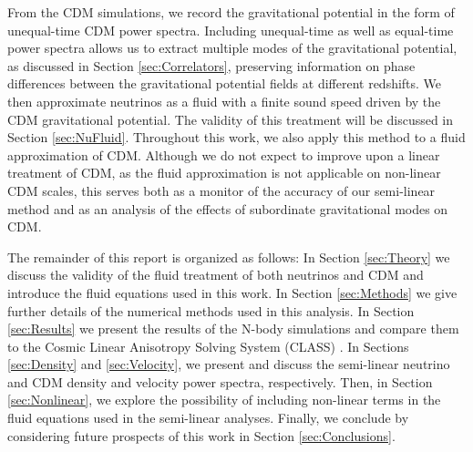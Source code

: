 \documentclass{aastex}
\begin{document}
From the CDM simulations, we record the gravitational
potential in the form of unequal-time CDM power
spectra. Including unequal-time as well as equal-time power spectra
allows us to extract multiple modes of the gravitational
potential, as discussed in Section \ref{sec:Correlators},
preserving information on phase differences between the gravitational potential
fields at different redshifts.  
We then approximate neutrinos as a fluid with a finite sound
speed driven by the CDM gravitational potential.  The
validity of this treatment will be discussed in Section
\ref{sec:NuFluid}.  Throughout this work, we also apply this 
method to a fluid approximation of CDM.  Although we do
not expect to improve upon a linear treatment of CDM, as the
fluid approximation is not applicable on non-linear CDM
scales, 
this serves both as a monitor
of the accuracy of our semi-linear method and as an analysis of the
effects of subordinate gravitational modes on CDM.

The remainder of this report is organized as follows:  In Section
\ref{sec:Theory} we discuss the validity of the fluid treatment
of both neutrinos and CDM and introduce the fluid equations
used in this work.  In Section \ref{sec:Methods} we give further
details of the numerical methods used in this analysis.  In Section
\ref{sec:Results} we present the results of the N-body
simulations and compare them to the Cosmic Linear Anisotropy
Solving System (CLASS) \citep{class11}.  In Sections
\ref{sec:Density} and \ref{sec:Velocity}, we
present
and discuss
 the semi-linear neutrino and CDM density
 and
velocity power spectra, respectively. 
Then, in Section \ref{sec:Nonlinear}, we explore the possibility of 
 including non-linear terms in the fluid equations used in the
 semi-linear analyses.
 Finally, we
conclude by considering future prospects of
this work in Section \ref{sec:Conclusions}.


\end{document}
